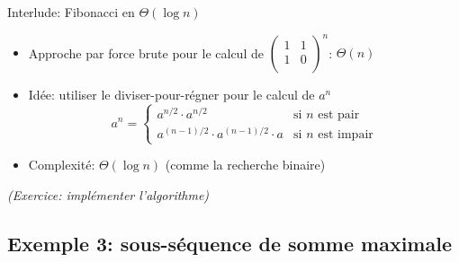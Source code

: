 \begin{frame}{Interlude: Fibonacci en $\Theta(\log n)$}
\begin{itemize}
\item Approche par force brute pour le calcul de $\begin{pmatrix} 1&1\\1&0\\\end{pmatrix}^n$: $\Theta(n)$
\item Idée: utiliser le diviser-pour-régner pour le calcul de $a^n$
\[
a^n = \left\{
\begin{array}{ll}
a^{n/2} \cdot a^{n/2}  & \mbox{si }n\mbox{ est pair}\\
a^{(n-1)/2}\cdot a^{(n-1)/2} \cdot a & \mbox{si }n\mbox{ est impair}
\end{array}
\right.
\]
\item Complexité: $\Theta(\log n)$ (comme la recherche binaire)
\end{itemize}

\bigskip

{\it (Exercice: implémenter l'algorithme)}
\end{frame}

\subsection{Exemple 3: sous-séquence de somme maximale}

